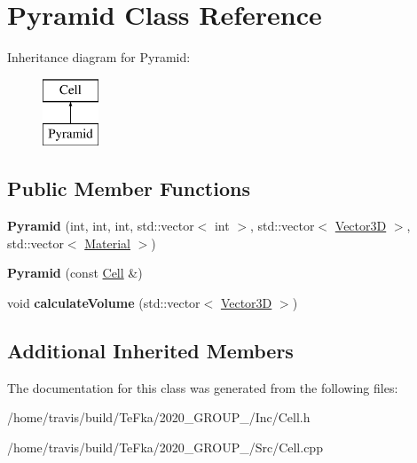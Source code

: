 \hypertarget{class_pyramid}{}\section{Pyramid Class Reference}
\label{class_pyramid}
Inheritance diagram for Pyramid\+:\begin{figure}[H]
\begin{center}
\leavevmode
\includegraphics[height=2.000000cm]{class_pyramid}
\end{center}
\end{figure}
\subsection*{Public Member Functions}
\begin{DoxyCompactItemize}
\item 
{\bfseries Pyramid} (int, int, int, std\+::vector$<$ int $>$, std\+::vector$<$ \hyperlink{class_vector3_d}{Vector3D} $>$, std\+::vector$<$ \hyperlink{class_material}{Material} $>$)\hypertarget{class_pyramid_a2bf002316570b7e3b9b28c302b0d0259}{}\label{class_pyramid_a2bf002316570b7e3b9b28c302b0d0259}

\item 
{\bfseries Pyramid} (const \hyperlink{class_cell}{Cell} \&)\hypertarget{class_pyramid_aea1431df57752208f06d9f0e3d1bcb3b}{}\label{class_pyramid_aea1431df57752208f06d9f0e3d1bcb3b}

\item 
void {\bfseries calculate\+Volume} (std\+::vector$<$ \hyperlink{class_vector3_d}{Vector3D} $>$)\hypertarget{class_pyramid_a618910cb445a8b22d784905fda2ec2bc}{}\label{class_pyramid_a618910cb445a8b22d784905fda2ec2bc}

\end{DoxyCompactItemize}
\subsection*{Additional Inherited Members}


The documentation for this class was generated from the following files\+:\begin{DoxyCompactItemize}
\item 
/home/travis/build/\+Te\+Fka/2020\+\_\+\+G\+R\+O\+U\+P\+\_/\+Inc/Cell.\+h\item 
/home/travis/build/\+Te\+Fka/2020\+\_\+\+G\+R\+O\+U\+P\+\_/\+Src/Cell.\+cpp\end{DoxyCompactItemize}
